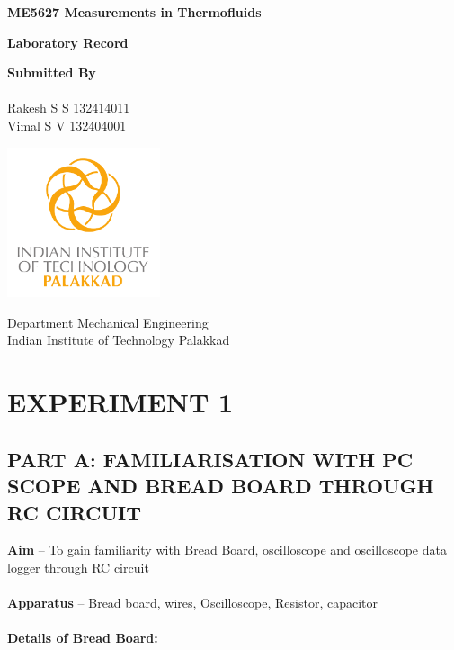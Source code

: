 \documentclass[9pt]{scrreprt}
\begin{document}
\begin{titlepage}
   \begin{center}
       \large
       \vspace*{1cm}

       \textbf{ME5627 Measurements in Thermofluids }

       \vspace{0.5cm}
       
       \textbf{Laboratory Record}
       
       \vspace{6cm}

       \textbf{Submitted By\\~\\}
       {Rakesh S S 132414011 \\Vimal S V 132404001}


       \vspace{4cm}
     
       {\includegraphics[width=4.5cm]{logos/iitpkd_fulllogo_color.pdf} \\}
       
       \vspace{2cm}   
       
       Department Mechanical Engineering\\
       Indian Institute of Technology Palakkad

   \end{center}
\end{titlepage}
\newpage

\chapter*{\Large EXPERIMENT 1}
\setcounter{chapter}{1}
\section*{\normalsize PART A: FAMILIARISATION WITH PC SCOPE AND BREAD BOARD THROUGH
RC CIRCUIT}
\textbf{Aim} – To gain familiarity with Bread Board, oscilloscope and oscilloscope data logger through RC circuit\\
\\
\textbf{Apparatus} – Bread board, wires, Oscilloscope, Resistor, capacitor\\
\\
\textbf{Details of Bread Board:}
\end{document}
